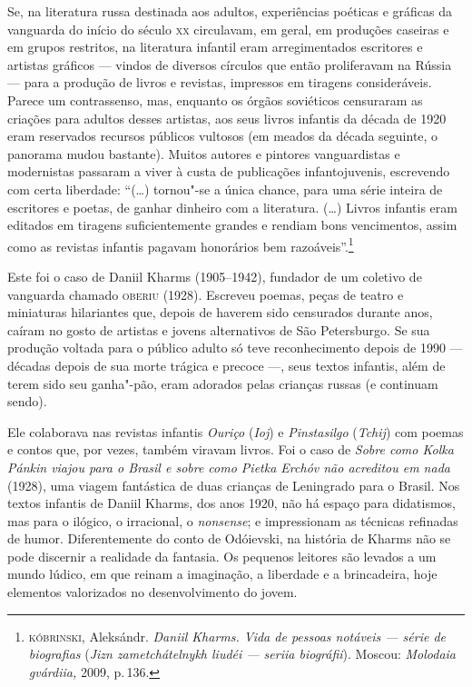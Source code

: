Se, na literatura russa destinada aos adultos, experiências poéticas e
gráficas da vanguarda do início do século \textsc{xx} circulavam, em geral, em
produções caseiras e em grupos restritos, na literatura infantil eram
arregimentados escritores e artistas gráficos --- vindos de diversos
círculos que então proliferavam na Rússia --- para a produção de livros
e revistas, impressos em tiragens consideráveis. Parece um contrassenso,
mas, enquanto os órgãos soviéticos censuraram as criações para adultos
desses artistas, aos seus livros infantis da década de 1920 eram
reservados recursos públicos vultosos (em meados da década seguinte, o
panorama mudou bastante). Muitos autores e pintores vanguardistas e
modernistas passaram a viver à custa de publicações infantojuvenis,
escrevendo com certa liberdade: ``(\ldots) tornou"-se a única chance, para
uma série inteira de escritores e poetas, de ganhar dinheiro com a
literatura. (\ldots) Livros infantis eram editados em tiragens
suficientemente grandes e rendiam bons vencimentos, assim como as
revistas infantis pagavam honorários bem razoáveis''.\footnote{\textsc{kóbrinski},
  Aleksándr. \emph{Daniil Kharms. Vida de pessoas notáveis --- série de
  biografias} (\emph{Jizn zametchátelnykh liudéi --- seriia
  biográfii}). Moscou: \emph{Molodaia gvárdiia,} 2009, p.\,136.}

Este foi o caso de Daniil Kharms (1905--1942), fundador de um coletivo
de vanguarda chamado \textsc{oberiu} (1928). Escreveu poemas, peças de teatro e
miniaturas hilariantes que, depois de haverem sido censurados durante
anos, caíram no gosto de artistas e jovens alternativos de São
Petersburgo. Se sua produção voltada para o público adulto só teve
reconhecimento depois de 1990 --- décadas depois de sua morte trágica e
precoce ---, seus textos infantis, além de terem sido seu ganha"-pão,
eram adorados pelas crianças russas (e continuam sendo).

Ele colaborava nas revistas infantis \emph{Ouriço} (\emph{Ioj}) e
\emph{Pinstasilgo} (\emph{Tchij}) com poemas e contos que, por vezes,
também viravam livros. Foi o caso de \emph{Sobre como Kolka Pánkin
viajou para o Brasil e sobre como Pietka Erchóv não acreditou em nada}
(1928), uma viagem fantástica de duas crianças de Leningrado para o
Brasil. Nos textos infantis de Daniil Kharms, dos anos 1920, não há
espaço para didatismos, mas para o ilógico, o irracional, o
\emph{nonsense}; e impressionam as técnicas refinadas de humor.
Diferentemente do conto de Odóievski, na história de Kharms não se pode
discernir a realidade da fantasia. Os pequenos leitores são levados a um
mundo lúdico, em que reinam a imaginação, a liberdade e a brincadeira,
hoje elementos valorizados no desenvolvimento do jovem.

